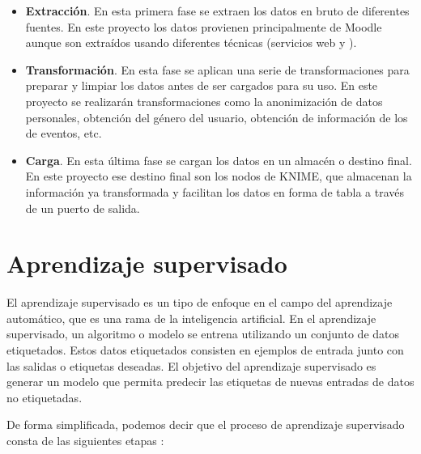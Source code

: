 \begin{itemize}
	\item \textbf{Extracción}. En esta primera fase se extraen los datos en bruto de diferentes fuentes. En este proyecto los datos 
    provienen principalmente de Moodle aunque son extraídos usando diferentes técnicas (servicios web y ). 
	\item \textbf{Transformación}. En esta fase se aplican una serie de transformaciones para preparar y limpiar los datos antes de 
	ser cargados para su uso. En este proyecto se realizarán transformaciones como la anonimización de datos personales, 
    obtención del género del usuario, obtención de información de los  de eventos, etc.     
	\item \textbf{Carga}. En esta última fase se cargan los datos en un almacén o destino final. En este proyecto ese destino final son 
	los nodos de KNIME, que almacenan la información ya transformada y facilitan los datos en forma de tabla a través de un puerto de salida. 
\end{itemize}



\section{Aprendizaje supervisado}

El aprendizaje supervisado es un tipo de enfoque en el campo del aprendizaje automático, que es una rama de la inteligencia artificial. 
En el aprendizaje supervisado, un algoritmo o modelo se entrena utilizando un conjunto de datos etiquetados. 
Estos datos etiquetados consisten en ejemplos de entrada junto con las salidas o etiquetas deseadas. 
El objetivo del aprendizaje supervisado es generar un modelo que permita 
predecir las etiquetas de nuevas entradas de datos no etiquetadas.
\

De forma simplificada, podemos decir que el proceso de aprendizaje supervisado consta de las siguientes etapas \cite{aprendizaje}: 

